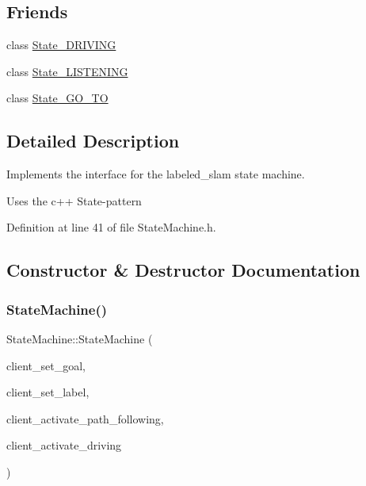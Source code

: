 \subsection*{Friends}
\begin{DoxyCompactItemize}
\item 
class \hyperlink{class_state_machine_a9f3d690f79a1c7f54e4417a8a3dfab55}{State\+\_\+\+D\+R\+I\+V\+I\+NG}
\item 
class \hyperlink{class_state_machine_a6309eb5fa74ee5fdbbe99598c54aa8ef}{State\+\_\+\+L\+I\+S\+T\+E\+N\+I\+NG}
\item 
class \hyperlink{class_state_machine_ae1f479386d109e891cf95b71a1fa9d38}{State\+\_\+\+G\+O\+\_\+\+TO}
\end{DoxyCompactItemize}


\subsection{Detailed Description}
Implements the interface for the labeled\+\_\+slam state machine. 

Uses the c++ \textquotesingle{}State\textquotesingle{}-\/pattern 

Definition at line 41 of file State\+Machine.\+h.



\subsection{Constructor \& Destructor Documentation}
\mbox{\label{class_state_machine_aa4732b2706c581cb8aac47674b52a8b5}} 
\subsubsection{\texorpdfstring{State\+Machine()}{StateMachine()}}
{\footnotesize\ttfamily State\+Machine\+::\+State\+Machine (\begin{DoxyParamCaption}\item[{ros\+::\+Service\+Client $\ast$}]{client\+\_\+set\+\_\+goal,  }\item[{ros\+::\+Service\+Client $\ast$}]{client\+\_\+set\+\_\+label,  }\item[{ros\+::\+Service\+Client $\ast$}]{client\+\_\+activate\+\_\+path\+\_\+following,  }\item[{ros\+::\+Service\+Client $\ast$}]{client\+\_\+activate\+\_\+driving }\end{DoxyParamCaption})}



